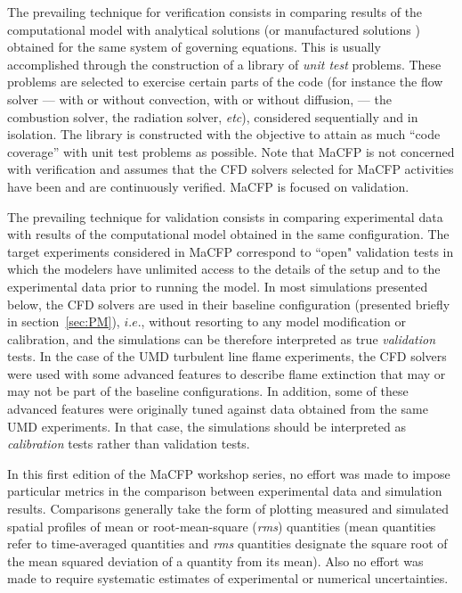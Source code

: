 The prevailing technique for verification consists in comparing results of the computational model with analytical solutions (or manufactured solutions \cite{Oberkampf:2010}) obtained for the same system of governing equations. This is usually accomplished through the construction of a library of \emph{unit test} problems. These problems are selected to exercise certain parts of the code (for instance the flow solver --- with or without convection, with or without diffusion, --- the combustion solver, the radiation solver, {\it etc}), considered sequentially and in isolation. The library is constructed with the objective to attain as much ``code coverage'' with unit test problems as possible. Note that MaCFP is not concerned with verification and assumes that the CFD solvers selected for MaCFP activities have been and are continuously verified. MaCFP is focused on validation.

The prevailing technique for validation consists in comparing experimental data with results of the computational model obtained in the same configuration. The target experiments considered in MaCFP correspond to ``open" validation tests in which the modelers have unlimited access to the details of the setup and to the experimental data prior to running the model. In most simulations presented below, the CFD solvers are used in their baseline configuration (presented briefly in section~\ref{sec:PM}), $i.e.$, without resorting to any model modification or calibration, and the simulations can be therefore interpreted as true \emph{validation} tests. In the case of the UMD turbulent line flame experiments, the CFD solvers were used with some advanced features to describe flame extinction that may or may not be part of the baseline configurations. In addition, some of these advanced features were originally tuned against data obtained from the same UMD experiments. In that case, the simulations should be interpreted as \emph{calibration} tests rather than validation tests.

In this first edition of the MaCFP workshop series, no effort was made to impose particular metrics in the comparison between experimental data and simulation results. Comparisons generally take the form of plotting measured and simulated spatial profiles of mean or root-mean-square ({\it rms}) quantities (mean quantities refer to time-averaged quantities and {\it rms} quantities designate the square root of the mean squared deviation of a quantity from its mean). Also no effort was made to require systematic estimates of experimental or numerical uncertainties.

